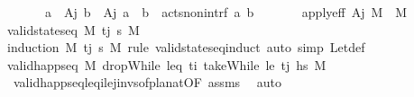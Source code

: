 \begin{isabellebody}
\ \ \ \ \ \ {}{\isacharcolon}{\kern0pt}\ {\isachardoublequoteopen}{\isasymforall}a\ {\isasymin}\ {\isacharquery}{\kern0pt}A\isactrlsub j{\isachardot}{\kern0pt}\ {\isasymforall}b\ {\isasymin}\ {\isacharquery}{\kern0pt}A\isactrlsub j{\isachardot}{\kern0pt}\ a\ {\isasymnoteq}\ b\ {\isasymlongrightarrow}\ acts{\isacharunderscore}{\kern0pt}non{\isacharunderscore}{\kern0pt}intrf\ a\ b{\isachardoublequoteclose}\isanewline
\ \ \ \ \ \ {}{\isacharcolon}{\kern0pt}\ {\isachardoublequoteopen}apply{\isacharunderscore}{\kern0pt}eff\ {\isacharquery}{\kern0pt}A\isactrlsub j\ M\ {\isacharequal}{\kern0pt}\ M{\isacharprime}{\kern0pt}{\isachardoublequoteclose}\isanewline
\ \ \ \ \ \ \isamarkupfalse%
\ {\isacartoucheopen}valid{\isacharunderscore}{\kern0pt}state{\isacharunderscore}{\kern0pt}seq\ M\ {\isacharbrackleft}{\kern0pt}t\isactrlsub j{\isacharbrackright}{\kern0pt}\ {\isasympi}s\ M{\isacharprime}{\kern0pt}{\isacartoucheclose}\isanewline
\ \ \ \ \ \ \isamarkupfalse%
\ {\isacharparenleft}{\kern0pt}induction\ M\ {\isachardoublequoteopen}{\isacharbrackleft}{\kern0pt}t\isactrlsub j{\isacharbrackright}{\kern0pt}{\isachardoublequoteclose}\ {\isasympi}s\ M{\isacharprime}{\kern0pt}\ rule{\isacharcolon}{\kern0pt}\ valid{\isacharunderscore}{\kern0pt}state{\isacharunderscore}{\kern0pt}seq{\isachardot}{\kern0pt}induct{\isacharparenright}{\kern0pt}\ {\isacharparenleft}{\kern0pt}auto\ simp{\isacharcolon}{\kern0pt}\ Let{\isacharunderscore}{\kern0pt}def{\isacharparenright}{\kern0pt}\isanewline
\isanewline
\ \ \ \ \isamarkupfalse%
\ {\isachardoublequoteopen}valid{\isacharunderscore}{\kern0pt}happ{\isacharunderscore}{\kern0pt}seq\ M\ {\isacharparenleft}{\kern0pt}dropWhile\ {\isacharparenleft}{\kern0pt}leq\ t\isactrlsub i{\isacharparenright}{\kern0pt}\ {\isacharparenleft}{\kern0pt}takeWhile\ {\isacharparenleft}{\kern0pt}le\ t\isactrlsub j{\isacharparenright}{\kern0pt}\ hs{\isacharparenright}{\kern0pt}{\isacharparenright}{\kern0pt}\ M{\isachardoublequoteclose}\isanewline
\ \ \ \ \ \ \isamarkupfalse%
\ {}\ valid{\isacharunderscore}{\kern0pt}happ{\isacharunderscore}{\kern0pt}seq{\isacharunderscore}{\kern0pt}leq\isactrlsub i{\isacharunderscore}{\kern0pt}le\isactrlsub j{\isacharunderscore}{\kern0pt}invs{\isacharunderscore}{\kern0pt}of{\isacharunderscore}{\kern0pt}plan{\isacharunderscore}{\kern0pt}at{\isacharbrackleft}{\kern0pt}OF\ assms{\isacharbrackright}{\kern0pt}\ \isamarkupfalse%
\ auto\isanewline
\isanewline
\ \ \ \ \isamarkupfalse%

\end{isabellebody}
